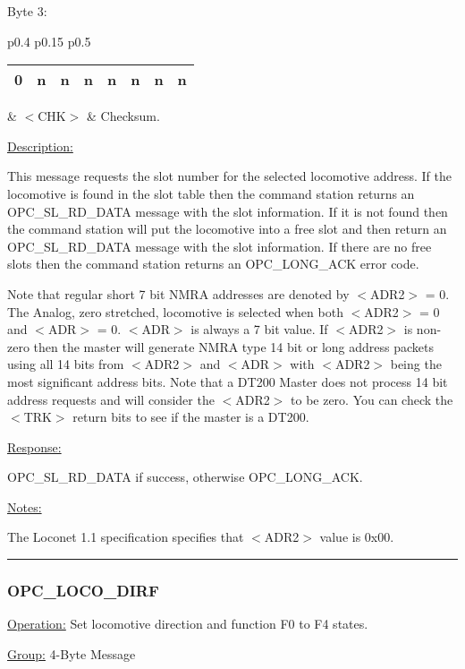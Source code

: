 Byte 3:

\begin{tabular}{p{0.4\linewidth} p{0.15\linewidth} p{0.5\linewidth}} 

\begin{tabular}{|p{0.3cm}|p{0.3cm}|p{0.3cm}|p{0.3cm}|p{0.3cm}|p{0.3cm}|p{0.3cm}|p{0.3cm}|}
\hline
0 & n & n & n & n & n & n & n\\
\hline
\end{tabular}
& $<$CHK$>$ & Checksum.

\end{tabular}

\underline{Description:}

This message requests the slot number for the selected locomotive address. If the locomotive is found in the slot table then the command station returns an OPC\_SL\_RD\_DATA message with the slot information. If it is not found then the command station will put the locomotive into a free slot and then return an OPC\_SL\_RD\_DATA message with the slot information. If there are no free slots then the command station returns an OPC\_LONG\_ACK error code.

Note that regular short 7 bit NMRA addresses are denoted by $<$ADR2$>$ = 0. The Analog, zero stretched, locomotive is selected when both $<$ADR2$>$ = 0 and $<$ADR$>$ = 0. $<$ADR$>$ is always a 7 bit value. If $<$ADR2$>$ is non-zero then the master will generate NMRA type 14 bit or long address packets using all 14 bits from $<$ADR2$>$ and $<$ADR$>$ with $<$ADR2$>$ being the most significant address bits. Note that a DT200 Master does not process 14 bit address requests and will consider the $<$ADR2$>$ to be zero. You can check the $<$TRK$>$ return bits to see if the master is a DT200.

\underline{Response:} 

OPC\_SL\_RD\_DATA if success, otherwise OPC\_LONG\_ACK.

\underline{Notes:} 

The Loconet 1.1 specification specifies that $<$ADR2$>$ value is 0x00.

\rule{15.1cm}{0.4pt}
\subsubsection{OPC\_LOCO\_DIRF}
\underline{Operation:} Set locomotive direction and function F0 to F4 states.

\underline{Group:} \hspace{0.5cm} 4-Byte Message

